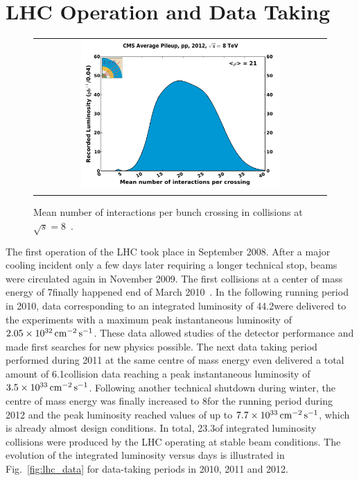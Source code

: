 \section{LHC Operation and Data Taking}
\label{sec:data}
\begin{figure}[!t]
  \centering
  \begin{tabular}{c}
    \includegraphics[width=0.7\textwidth]{figures/pileup_pp_2012.pdf} 
  \end{tabular}
  \caption{Mean number of interactions per bunch crossing in \pp collisions at $\sqrt{s} = 8$\tev~\cite{bib:lhc:lumi12}.}
  \label{fig:lhc_pileup}
\end{figure}
The first operation of the LHC took place in September 2008. After a major cooling incident only a few days later requiring a longer technical stop, beams were circulated again in November 2009. The first collisions at a center of mass energy of 7\tev finally happened end of March 2010~\cite{bib:lhcmachineoutreach}. In the following running period in 2010, data corresponding to an integrated luminosity of 44.2\pbinv were delivered to the experiments with a maximum peak instantaneous luminosity of $2.05 \times 10^{32} \,\text{cm}^{-2} \,\text{s}^{-1}$. These data allowed studies of the detector performance and made first searches for new physics possible. The next data taking period performed during 2011 at the same centre of mass energy even delivered a total amount of 6.1\fbinv \pp collision data reaching a peak instantaneous luminosity of $3.5 \times 10^{33} \,\text{cm}^{-2} \,\text{s}^{-1}$. Following another technical shutdown during winter, the centre of mass energy was finally increased to 8\tev for the running period during 2012 and the peak luminosity reached values of up to $7.7 \times 10^{33} \,\text{cm}^{-2} \,\text{s}^{-1}$, which is already almost design conditions. In total, 23.3\fbinv of integrated luminosity \pp collisions were produced by the LHC operating at stable beam conditions. The evolution of the integrated luminosity versus days is illustrated in Fig.~\ref{fig:lhc_data} for data-taking periods in 2010, 2011 and 2012. \\
